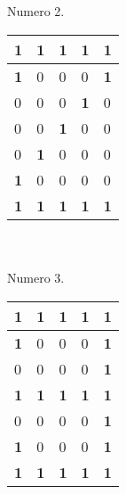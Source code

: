 \documentclass[40pt]{article}
\begin{document}
\maketitle
\textsf{\\
\\
Numero 2.\\}

\vspace{0.0 cm}
\begin{table}[h!]
\begin{tabular}{|p{.3 cm}|p{.3 cm}|p{.3 cm}|p{.3 cm}|p{.3 cm}| }
\hline
\textbf{1}&\textbf{1}&\textbf{1}&\textbf{1}&\textbf{1}
\\\hline
\textbf{1}&0&0&0&\textbf{1}
\\\hline
0&0&0&\textbf{1}&0
\\\hline
0&0&\textbf{1}&0&0
\\\hline
0&\textbf{1}&0&0&0
\\\hline
\textbf{1}&0&0&0&0
\\\hline
\textbf{1}&\textbf{1}&\textbf{1}&\textbf{1}&\textbf{1}
\\\hline
\end{tabular}
\end{table}


\maketitle
\textsf{\\
\\
Numero 3.\\}

\vspace{0.0 cm}
\begin{table}[h!]
\begin{tabular}{|p{.3 cm}|p{.3 cm}|p{.3 cm}|p{.3 cm}|p{.3 cm}| }
\hline
\textbf{1}&\textbf{1}&\textbf{1}&\textbf{1}&\textbf{1}
\\\hline
\textbf{1}&0&0&0&\textbf{1}
\\\hline
0&0&0&0&\textbf{1}
\\\hline
\textbf{1}&\textbf{1}&\textbf{1}&\textbf{1}&\textbf{1}
\\\hline
0&0&0&0&\textbf{1}
\\\hline
\textbf{1}&0&0&0&\textbf{1}
\\\hline
\textbf{1}&\textbf{1}&\textbf{1}&\textbf{1}&\textbf{1}
\\\hline
\end{tabular}
\end{table}
\end{document}
